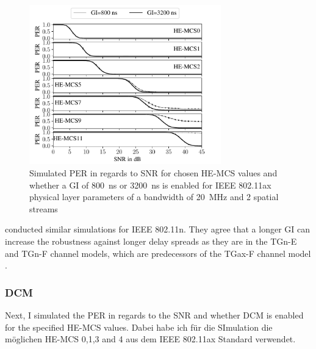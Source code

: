 \begin{figure}[H]%
   \centering
   \includegraphics[width=0.74\textwidth]{figures/GI_PER_to_SNR.pdf}
   \caption{Simulated \ac{PER} in regards to \ac{SNR} for chosen HE-\ac{MCS} values and whether a \ac{GI} of \SI{800}{\nano\second} or \SI{3200}{\nano\second} is enabled for IEEE 802.11ax physical layer parameters of a bandwidth of \SI{20}{\mega\hertz} and 2 spatial streams}%
   \label{fig:PER_SNR_GI}%
\end{figure}
\textcite{patil_ieee_2020} conducted similar simulations for IEEE 802.11n.
They agree that a longer \ac{GI} can increase the robustness against longer delay spreads as they are in the TGn-E and TGn-F channel models,
which are predecessors of the TGax-F channel model \cite{TGAXCHANNEL}.

\subsubsection*{\acf{DCM}}
Next, I simulated the \ac{PER} in regards to the \ac{SNR}  and whether \ac{DCM} is enabled for the specified HE-\ac{MCS} values. Dabei habe ich für die SImulation die möglichen
HE-MCS \num{0},\num{1},\num{3} and \num{4} aus dem IEEE 802.11ax Standard verwendet.

